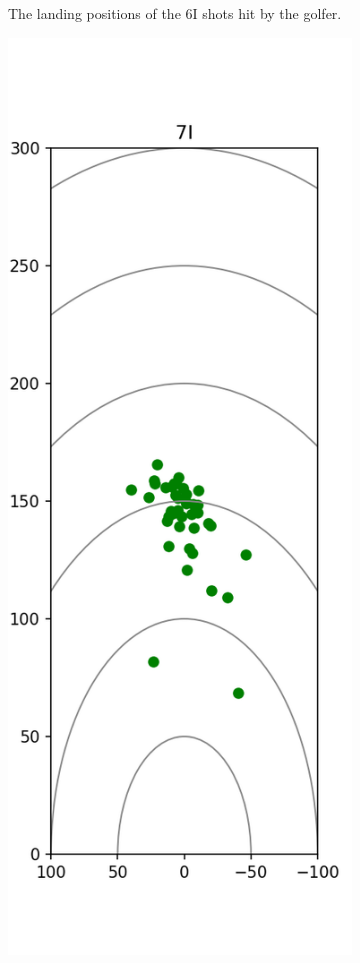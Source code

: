 \documentclass{kththesis}
\begin{document}
\begin{figure}
\begin{subfigure}{0.4\textwidth}
    \caption{The landing positions of the 6I shots hit by the golfer.}
    \label{fig:6I_shots}
    \end{subfigure}
    \begin{subfigure}{0.4\textwidth}
    \centering
    \includegraphics[height=0.4\textheight]{Shots/7I_shots.png} 

\end{subfigure}
\end{figure}
\end{document}
